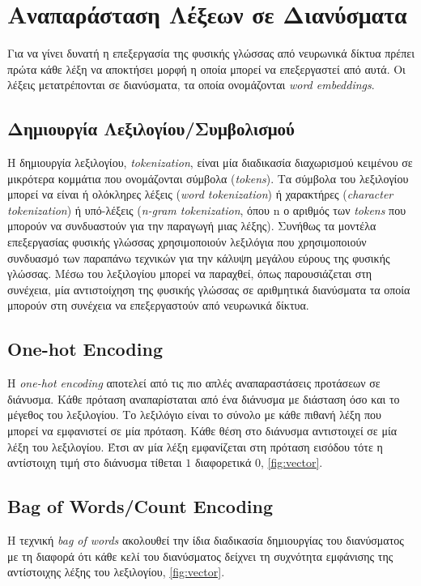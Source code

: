 \section{Αναπαράσταση Λέξεων σε Διανύσματα}
Για να γίνει δυνατή η επεξεργασία της φυσικής γλώσσας από νευρωνικά δίκτυα πρέπει πρώτα κάθε λέξη να αποκτήσει μορφή η οποία μπορεί να επεξεργαστεί από αυτά. Οι λέξεις μετατρέπονται σε διανύσματα, τα οποία ονομάζονται \emph{word embeddings}.

\subsection{Δημιουργία Λεξιλογίου/Συμβολισμού}
Η δημιουργία λεξιλογίου, \emph{tokenization}, είναι μία διαδικασία διαχωρισμού κειμένου σε μικρότερα κομμάτια που ονομάζονται σύμβολα (\emph{tokens}). Τα σύμβολα του λεξιλογίου μπορεί να είναι ή ολόκληρες λέξεις (\emph{word tokenization}) ή χαρακτήρες (\emph{character tokenization}) ή υπό-λέξεις (\emph{n-gram tokenization}, όπου n ο αριθμός των \emph{tokens} που μπορούν να συνδυαστούν για την παραγωγή μιας λέξης). Συνήθως τα μοντέλα επεξεργασίας φυσικής γλώσσας χρησιμοποιούν λεξιλόγια που χρησιμοποιούν συνδυασμό των παραπάνω τεχνικών για την κάλυψη μεγάλου εύρους της φυσικής γλώσσας. Μέσω του λεξιλογίου μπορεί να παραχθεί, όπως παρουσιάζεται στη συνέχεια, μία αντιστοίχηση της φυσικής γλώσσας σε αριθμητικά διανύσματα τα οποία μπορούν στη συνέχεια να επεξεργαστούν από νευρωνικά δίκτυα. 

\subsection{One-hot Encoding}
Η \emph{one-hot encoding} αποτελεί από τις πιο απλές αναπαραστάσεις προτάσεων σε διάνυσμα. Κάθε πρόταση αναπαρίσταται από ένα διάνυσμα με διάσταση όσο και το μέγεθος του λεξιλογίου. Το λεξιλόγιο είναι το σύνολο με κάθε πιθανή λέξη  που μπορεί να εμφανιστεί σε μία πρόταση. Κάθε θέση στο διάνυσμα αντιστοιχεί σε μία λέξη του λεξιλογίου. Έτσι αν μία λέξη εμφανίζεται στη πρόταση εισόδου τότε η αντίστοιχη τιμή στο διάνυσμα τίθεται $1$ διαφορετικά $0$, \autoref{fig:vector}.

\subsection{Bag of Words/Count Encoding}
Η τεχνική \emph{bag of words} ακολουθεί την ίδια διαδικασία δημιουργίας του διανύσματος με τη διαφορά ότι κάθε κελί του διανύσματος δείχνει τη συχνότητα εμφάνισης της αντίστοιχης λέξης του λεξιλογίου, \autoref{fig:vector}.


